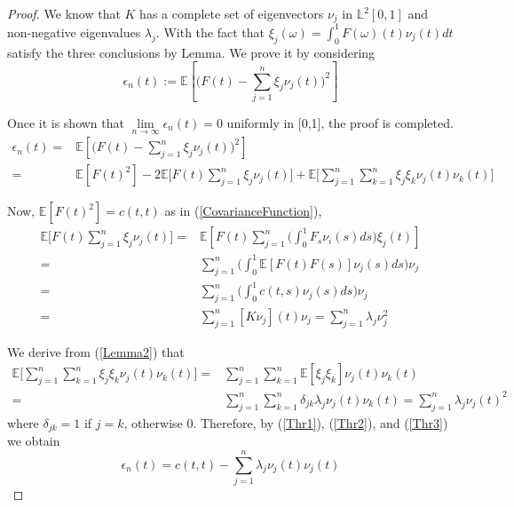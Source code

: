 \documentclass[11pt,twoside,a4paper]{article}
\begin{document}
	\begin{proof}
		We know that $K$ has a complete set of eigenvectors ${\nu_{j}}$ in $\mathbb{L}^{2}[0,1]$ and non-negative eigenvalues $\lambda_{j}$. With the fact that $\xi_{j}(\omega) = \int_{0}^{1} F(\omega)(t) \nu_{j}(t)dt$ satisfy the three conclusions by Lemma. We prove it by considering
		\begin{equation}
			\epsilon_{n}(t) := \mathbb{E} \left[\bigg( F(t) - \sum_{j=1}^{n} \xi_{j} \nu_{j}(t)\bigg)^2 \right]
		\end{equation}
		
		Once it is shown that $\lim\limits_{n \rightarrow \infty} \epsilon_{n}(t) = 0$ uniformly in [0,1], the proof is completed.
		\begin{equation}\label{Thr1}
			\begin{split}
				\epsilon_{n}(t) = &\mathbb{E} \left[\bigg( F(t) - \sum_{j=1}^{n} \xi_{j} 	\nu_{j}(t)\bigg)^2 \right]\\
				= & \mathbb{E}[F(t)^{2}] - 2\mathbb{E}\bigg[F(t)\sum_{j=1}^{n}\xi_{j}\nu_{j}(t)\bigg] + \mathbb{E}\bigg[\sum_{j=1}^{n}\sum_{k=1}^{n}\xi_{j}\xi_{k}\nu_{j}(t)\nu_{k}(t)\bigg]
			\end{split}
		\end{equation}
		
		Now, $\mathbb{E}[F(t)^{2}] = c(t,t)$ as in (\ref{CovarianceFunction}),
		\begin{equation}\label{Thr2}
			\begin{split}
				\mathbb{E} \bigg[ F(t) \sum_{j=1}^{n} \xi_{j}\nu_{j}(t) \bigg] = & \mathbb{E} \left[ F(t) \sum_{j=1}^{n} \bigg(\int_{0}^{1} F_{s}\nu_{i}(s)ds\bigg) \xi_{j}(t) \right]\\
				= & \sum_{j=1}^{n} \bigg(\int_{0}^{1} \mathbb{E}[F(t)F(s)]\nu_{j}(s)ds\bigg)\nu_{j}\\
				= & \sum_{j=1}^{n} \bigg(\int_{0}^{1} c(t,s) \nu_{j}(s)ds\bigg)\nu_{j}\\
				= & \sum_{j=1}^{n}[K\nu_{j}](t)\nu_{j} = \sum_{j=1}^{n}\lambda_{j}\nu_{j}^{2}
			\end{split}
		\end{equation} 
		
		We derive from (\ref{Lemma2}) that
		\begin{equation}\label{Thr3}
			\begin{split}
				\mathbb{E}\bigg[\sum_{j=1}^{n} \sum_{k=1}^{n} \xi_{j} \xi_{k} \nu_{j}(t) \nu_{k}(t)\bigg] = & \sum_{j=1}^{n} \sum_{k=1}^{n} \mathbb{E}[\xi_{j} \xi_{k}] \nu_{j}(t) \nu_{k}(t)\\
				= & \sum_{j=1}^{n} \sum_{k=1}^{n} \delta_{jk} \lambda_{j} \nu_{j}(t) \nu_{k}(t) = 		\sum_{j=1}^{n} \lambda_{j} \nu_{j}(t)^{2}
			\end{split}	
		\end{equation}
		where $\delta_{jk} = 1$ if $j=k$, otherwise 0. Therefore, by (\ref{Thr1}), (\ref{Thr2}), and (\ref{Thr3}) we obtain
		\begin{equation}
			\epsilon_{n}(t) = c(t,t) - \sum_{j=1}^{n} \lambda_{j} \nu_{j}(t) \nu_{j}(t)
		\end{equation}
		

\end{proof}
\end{document}
